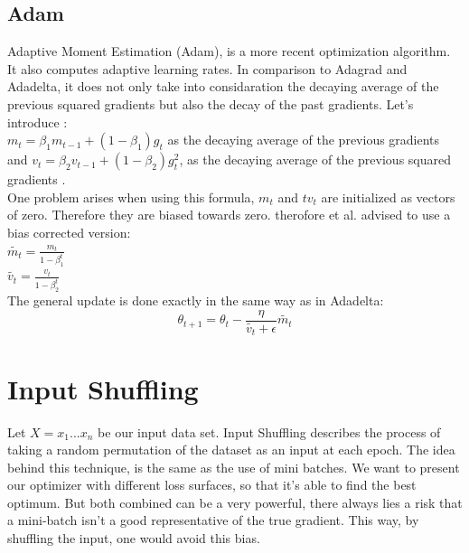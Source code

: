 \subsection{Adam}
Adaptive Moment Estimation (Adam), is a more recent optimization algorithm. It also computes adaptive learning rates. In comparison to Adagrad and Adadelta, it does not only take into considaration the decaying average of the previous squared gradients but also the decay of the past gradients. 
Let's introduce : \\
$m_t = \beta_1 m_{t-1} + (1- \beta_1) g_t $ as the decaying average of the previous gradients  \\
and $v_t = \beta_2 v_{t-1} + (1- \beta_2) g^2_t $, as the decaying average of the previous squared gradients . \\
One problem arises when using this formula, $m_t$  and $tv_t$ are initialized as vectors of zero. Therefore they are biased towards zero. therofore et al. advised to use a bias corrected version:\\
$ \tilde{m_t} = \frac{m_t}{1-\beta^t_1}$\\
$ \tilde{v_t} = \frac{v_t}{1-\beta^t_2}$\\
The general update is done exactly in the same way as in Adadelta:
\begin{equation}
\theta_{t+1} = \theta_t - \frac{\eta}{\tilde{v_t}+ \epsilon} \tilde{m_t}
\end{equation}

\section{Input Shuffling}
Let $X = {x_1...x_n}$ be our input data set. Input Shuffling describes the process of taking a random permutation of the dataset as an input at each epoch. 
The idea behind this technique, is the same as the use of mini batches. We want to present our optimizer with different loss surfaces, so that it's able to find the best optimum. But both combined can be a very powerful, there always lies a risk that a mini-batch isn't a good representative of the true gradient. This way, by shuffling the input, one would avoid this bias.
